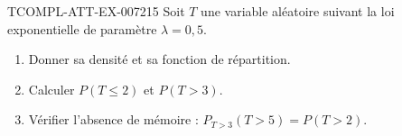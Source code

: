 \begin{exercice}{TCOMPL-ATT-EX-007}{2}{15}
Soit $T$ une variable aléatoire suivant la loi exponentielle de paramètre
$\lambda=0{,}5$.
\begin{enumerate}
  \item Donner sa densité et sa fonction de répartition.
  \item Calculer $P(T\leq2)$ et $P(T>3)$.
  \item Vérifier l'absence de mémoire : $P_{T>3}(T>5)=P(T>2)$.
\end{enumerate}
\end{exercice}
